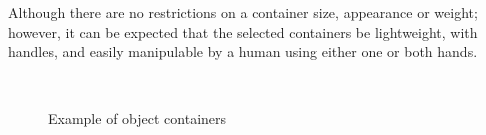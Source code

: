 Although there are no restrictions on a container size, appearance or weight; however, it can be expected that the selected containers be lightweight, with handles, and easily manipulable by a human using either one or both hands.

\begin{figure}[H]
	\centering
	~
	~
	\caption{Example of object containers}
	\label{fig:scenario_containers}
\end{figure}


